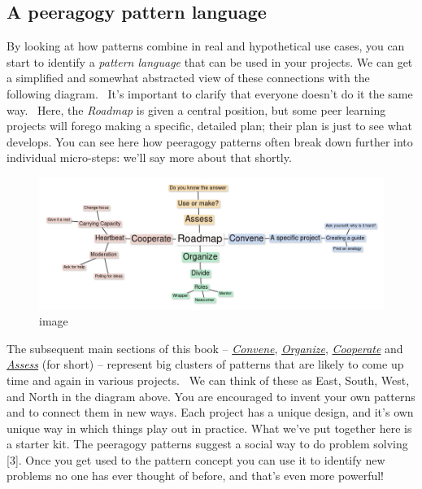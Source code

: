 \subsection{A peeragogy pattern
language}\label{a-peeragogy-pattern-language}

By looking at how patterns combine in real and hypothetical use cases,
you can start to identify a \emph{pattern language} that can be used
in your projects. We can get a simplified and somewhat abstracted view
of these connections with the following diagram.~ It's important to
clarify that everyone doesn't do it the same way.~ Here, the
\emph{Roadmap} is given a central position, but some peer learning
projects will forego making a specific, detailed plan; their plan is
just to see what develops. You can see here how peeragogy patterns
often break down further into individual micro-steps: we'll say more
about that shortly.

\begin{figure}[htbp]
\centering
\includegraphics[width=\textwidth]{../pictures/pattern-language.jpg}
\caption{image}
\end{figure}

The subsequent main sections of this book --
\href{http://peeragogy.org/convene/}{\emph{Convene}},
\href{http://peeragogy.org/organize/}{\emph{Organize}},
\href{http://peeragogy.org/facilitate/}{\emph{Cooperate}} and
\href{http://peeragogy.org/assessment/}{\emph{Assess}} (for short) --
represent big clusters of patterns that are likely to come up time and
again in various projects.~ We can think of these as East, South, West,
and North in the diagram above. You are encouraged to invent your own
patterns and to connect them in new ways. Each project has a unique
design, and it's own unique way in which things play out in practice.
What we've put together here is a starter kit. The peeragogy patterns
suggest a social way to do problem solving {[}3{]}.  Once you get
used to the pattern concept you can use it to identify new problems no
one has ever thought of before, and that's even more powerful!

